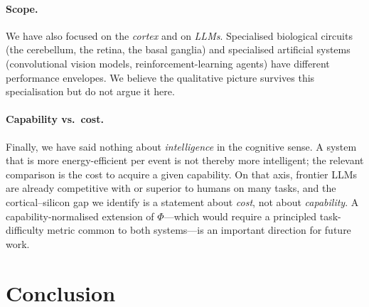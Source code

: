 \documentclass[11pt]{article}
\theoremstyle{definition}
\theoremstyle{remark}
\begin{document}
\paragraph{Scope.}
We have also focused on the \emph{cortex} and on \emph{LLMs}.
Specialised biological circuits (the cerebellum, the retina, the
basal ganglia) and specialised artificial systems (convolutional
vision models, reinforcement-learning agents) have different
performance envelopes.  We believe the qualitative picture survives
this specialisation but do not argue it here.

\paragraph{Capability vs.\ cost.}
Finally, we have said nothing about \emph{intelligence} in the
cognitive sense.  A system that is more energy-efficient per event is
not thereby more intelligent; the relevant comparison is the cost to
acquire a given capability.  On that axis, frontier LLMs are already
competitive with or superior to humans on many tasks, and the
cortical--silicon gap we identify is a statement about \emph{cost},
not about \emph{capability}.  A capability-normalised extension of
$\Phi$---which would require a principled task-difficulty metric
common to both systems---is an important direction for future work.

\section{Conclusion}
\label{sec:conclusion}
\end{document}
